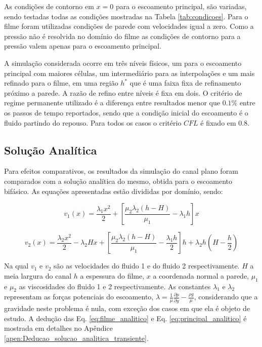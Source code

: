 As condições de contorno em $x = 0$ para o escoamento principal, são variadas, sendo testadas todas as condições mostradas na Tabela \ref{tab:condicoes}. Para o filme foram utilizadas condições de parede com velocidades igual a zero. Como a pressão não é resolvida no domínio do filme as condições de contorno para a pressão valem apenas para o escoamento principal.

A simulação considerada ocorre em três níveis físicos, um para o escoamento principal com maiores células, um intermediário para as interpolações e um mais refinado para o filme, em uma região $h^*$ que é uma faixa fixa de refinamento próximo a parede. A razão de refino entre níveis é fixa em dois. O critério de regime permanente utilizado é a diferença entre resultados menor que $0.1\%$ entre os passos de tempo reportados, sendo que a condição inicial do escoamento é o fluido partindo do repouso. Para todos os casos o critério $CFL$ é fixado em $0.8$.

\subsection{Solução Analítica}

Para efeitos comparativos, os resultados da simulação do canal plano foram comparados com a solução analítica do mesmo, obtida para o escoamento bifásico. As equações apresentadas estão divididas por domínio, sendo:

\begin{equation}
    v_1(x) = \frac{\lambda_1 x^2}{2} + \left[\frac{\mu_2 \lambda_2 \left(h-H\right)}{\mu_1} - \lambda_1 h\right]x
    \label{eq:filme_analitico}
\end{equation}

\begin{equation}
    v_2(x) = \frac{\lambda_2 x^2}{2} - \lambda_2 H x + \left[\frac{\mu_2 \lambda_2 \left(h-H\right)}{\mu_1} - \frac{\lambda_1 h}{2}\right]h + \lambda_2 h \left(H - \frac{h}{2}\right)
    \label{eq:principal_analitico}
\end{equation}

Na qual $v_1$ e $v_2$ são as velocidades do fluido 1 e do fluido 2 respectivamente. $H$ a meia largura do canal $h$ a espessura do filme, $x$ a coordenada normal a parede, $\mu_1$ e $\mu_2$ as viscosidades do fluido 1 e 2 respectivamente. As constantes $\lambda_1$ e $\lambda_2$ representam as forças potenciais do escoamento, $\lambda = \frac{1}{\mu} \frac{\partial p}{\partial y} - \frac{\rho g}{\mu}$, considerando que a gravidade neste problema é nula, com exceção dos casos em que ela é objeto de estudo. A dedução das Eq. \ref{eq:filme_analitico} e Eq. \ref{eq:principal_analitico} é mostrada em detalhes no Apêndice \ref{apen:Deducao_solucao_analitica_transiente}.

